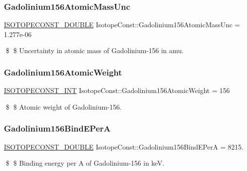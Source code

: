 \subsubsection{\texorpdfstring{Gadolinium156\+Atomic\+Mass\+Unc}{Gadolinium156AtomicMassUnc}}
{\footnotesize\ttfamily \mbox{\hyperlink{group___isotope_const-_macros_ga8f45a7272ce02c0b4c65c44636ed719a}{I\+S\+O\+T\+O\+P\+E\+C\+O\+N\+S\+T\+\_\+\+D\+O\+U\+B\+LE}} Isotope\+Const\+::\+Gadolinium156\+Atomic\+Mass\+Unc = 1.\+277e-\/06}

\$ \$ Uncertainty in atomic mass of Gadolinium-\/156 in amu. \mbox{\label{group___isotope_const-_gadolinium-_gd156_ga719557cb244eedeba37b04efdaa7e04d}} 
\subsubsection{\texorpdfstring{Gadolinium156\+Atomic\+Weight}{Gadolinium156AtomicWeight}}
{\footnotesize\ttfamily \mbox{\hyperlink{group___isotope_const-_macros_ga5f18360b3e99483a35c32d789e62621c}{I\+S\+O\+T\+O\+P\+E\+C\+O\+N\+S\+T\+\_\+\+I\+NT}} Isotope\+Const\+::\+Gadolinium156\+Atomic\+Weight = 156}

\$ \$ Atomic weight of Gadolinium-\/156. \mbox{\label{group___isotope_const-_gadolinium-_gd156_ga5026894c986c44ec174554097cc7e0ee}} 
\subsubsection{\texorpdfstring{Gadolinium156\+Bind\+E\+PerA}{Gadolinium156BindEPerA}}
{\footnotesize\ttfamily \mbox{\hyperlink{group___isotope_const-_macros_ga8f45a7272ce02c0b4c65c44636ed719a}{I\+S\+O\+T\+O\+P\+E\+C\+O\+N\+S\+T\+\_\+\+D\+O\+U\+B\+LE}} Isotope\+Const\+::\+Gadolinium156\+Bind\+E\+PerA = 8215.}

\$ \$ Binding energy per A of Gadolinium-\/156 in keV. \mbox{\label{group___isotope_const-_gadolinium-_gd156_gac11b409d9043b3afb7e53f5e77cc83f7}} 
